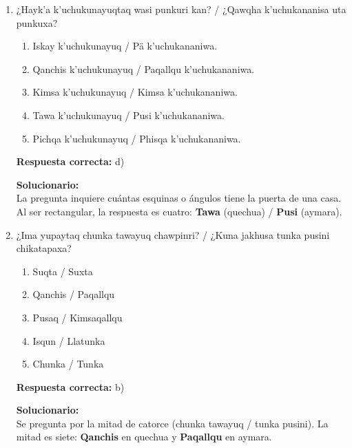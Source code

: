 \begin{enumerate}



\item ¿Hayk'a k'uchukunayuqtaq wasi punkuri kan? / ¿Qawqha k'uchukananisa uta punkuxa?

\begin{enumerate}[label=\alph*)]
	\item Iskay k'uchukunayuq / Pä k'uchukananiwa.
	\item Qanchis k'uchukunayuq / Paqallqu k'uchukananiwa.
	\item Kimsa k'uchukunayuq / Kimsa k'uchukananiwa.
	\item Tawa k'uchukunayuq / Pusi k'uchukananiwa.
	\item Pichqa k'uchukunayuq / Phisqa k'uchukananiwa.
\end{enumerate}

\textbf{Respuesta correcta:} d)

\vspace{2mm}
\textbf{Solucionario:}\\
La pregunta inquiere cuántas esquinas o ángulos tiene la puerta de una casa. Al ser rectangular, la respuesta es cuatro: \textbf{Tawa} (quechua) / \textbf{Pusi} (aymara).

\vspace{6mm}

\item ¿Ima yupaytaq chunka tawayuq chawpinri? / ¿Kuna jakhusa tunka pusini chikatapaxa?

\begin{enumerate}[label=\alph*)]
	\item Suqta / Suxta
	\item Qanchis / Paqallqu
	\item Pusaq / Kimsaqallqu
	\item Isqun / Llatunka
	\item Chunka / Tunka
\end{enumerate}

\textbf{Respuesta correcta:} b)

\vspace{2mm}
\textbf{Solucionario:}\\
Se pregunta por la mitad de catorce (chunka tawayuq / tunka pusini). La mitad es siete: \textbf{Qanchis} en quechua y \textbf{Paqallqu} en aymara.



\end{enumerate}











